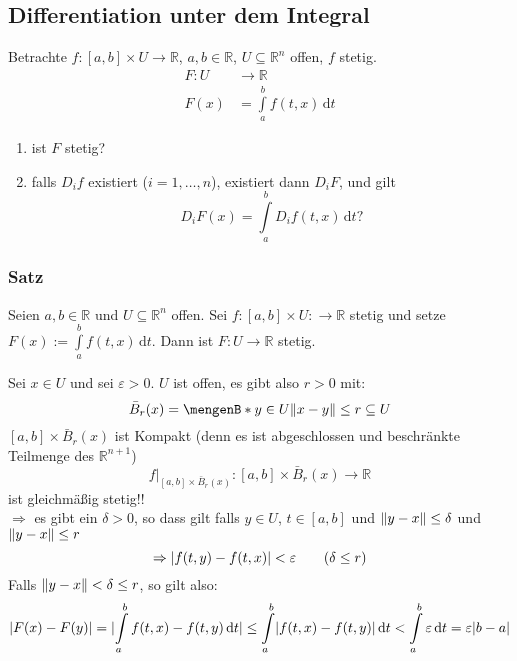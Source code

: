\subsection{Differentiation unter dem Integral} %
\label{sub:differentiation_unter_dem_integral}
Betrachte $f:[a,b] \times U \to \mathbb{R}$, $a,b \in \mathbb{R}$, $U \subseteq \mathbb{R}^n$ offen, $f$ stetig.
\begin{align*}
	F: U &\to \mathbb{R} \\
	F(x) &= \int\limits_{a}^{b}f(t,x) \,\mathrm{d}t
\end{align*}
\begin{enumerate}
	\item ist $F$ stetig?
	\item falls $D_if$ existiert ($i=1,\dots,n$), existiert dann $D_iF$, und gilt
	\[
		D_iF(x) = \int\limits_{a}^{b}D_if(t,x) \,\mathrm{d}t ? 
	\]
\end{enumerate}
\subsubsection{Satz} %
\label{ssub:satz}
Seien $a,b \in \mathbb{R}$ und $U \subseteq \mathbb{R}^n$ offen. Sei $f:[a,b] \times U: \to \mathbb{R}$ stetig und setze $F(x):= \int\limits_{a}^{b}f(t,x) \,\mathrm{d}t$. Dann ist $F: U \to \mathbb{R}$ stetig.

 Sei $x \in U$ und sei $\varepsilon >0$. $U$ ist offen, es gibt also $r>0$ mit:
\[
	\bar B_r(x)= \set[y \in U]{\norm{x-y}\leq r} \subseteq U 
\]
$[a,b] \times \bar B_r(x)$ ist Kompakt (denn es ist abgeschlossen und beschränkte Teilmenge des $\mathbb{R}^{n+1}$)
\[
	f  \Big|_{[a,b] \times \bar B_r(x)}^{} : [a,b] \times \bar B_r(x) \to \mathbb{R}
\] ist gleichmäßig stetig!! \\
$\Rightarrow$ es gibt ein $\delta >0$, so dass gilt falls $y \in U$, $t \in [a,b]$ und $\norm{y-x}\leq \delta $ und $\norm{y-x}\leq r$
\[
	\Rightarrow \lvert f(t,y)-f(t,x)\rvert<\varepsilon \qquad (\delta \leq r)
\] 
Falls $\norm{y-x}<\delta \leq r$, so gilt also:
\[
	\lvert F(x)-F(y)\rvert = \lvert \int\limits_{a}^{b}f(t,x)-f(t,y) \,\mathrm{d}t\rvert \leq \int\limits_{a}^{b} \lvert f(t,x)-f(t,y)\rvert \,\mathrm{d}t < \int\limits_{a}^{b} \varepsilon \,\mathrm{d}t = \varepsilon \lvert b-a\rvert
\] \bewende
